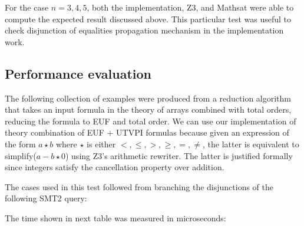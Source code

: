 For the case $n = 3, 4, 5$, both the implementation, Z3, and Mathsat were able
to compute the expected result discussed above. This particular test
was useful to check disjunction of equalities propagation mechanism in the
implementation work.

\subsection{Performance evaluation}

The following collection of examples were produced from a reduction 
algorithm that takes an input formula in the theory of arrays combined with
total orders, reducing the formula to EUF and total order. We can use our
implementation of theory combination of EUF + UTVPI formulas because 
given an expression of the form $a \star b$ where
$\star$ is either $<, \leq, >, \geq, =, \neq$, 
the latter is equivalent to 
simplify($a - b \star 0$) using Z3's arithmetic rewriter. 
The latter is justified formally since integers 
satisfy the cancellation property over addition.

The cases used in this test followed from branching the disjunctions
of the following SMT2 query:



The time shown in next table was measured in microseconds:

